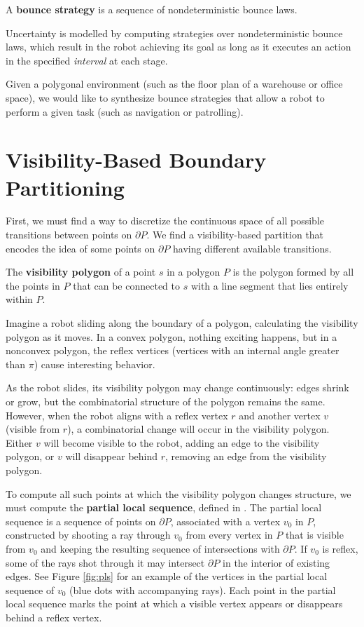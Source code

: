 \documentclass[]{styles/svproc}  %
\begin{document}
\begin{definition}
A \textbf{bounce strategy} is a sequence of nondeterministic bounce laws.
\end{definition}
Uncertainty is modelled by computing strategies over nondeterministic bounce
laws, which result in the robot achieving its goal as long as it executes an
action in the specified \emph{interval} at each stage.

Given a polygonal environment (such as the floor plan of a warehouse or office
space), we would like to synthesize bounce strategies that allow a robot to
perform a given task (such as navigation or patrolling).



\section{Visibility-Based Boundary Partitioning} \label{sec:partition}

First, we must find a way to discretize the continuous space of all possible
transitions between points on $\partial P$. We find a visibility-based partition
that encodes the idea of some points on $\partial P$ having different
available transitions.

\begin{definition}
The \textbf{visibility polygon} of a point $s$ in a polygon $P$ is the polygon
formed by all the points in $P$ that can be connected to $s$ with a line
segment that lies entirely within $P$.
\end{definition}
Imagine a robot sliding along the boundary of a polygon, calculating 
the visibility polygon as it moves. In a convex polygon, nothing exciting 
happens, but in a nonconvex polygon, the reflex vertices (vertices with an
internal angle greater than $\pi$) cause interesting
behavior.

As the robot slides, its visibility polygon may change continuously: edges
shrink or grow, but the combinatorial structure of the polygon remains the same.
However, when the robot aligns with a reflex vertex $r$ and another vertex $v$ (visible
from $r$), a combinatorial change will occur in the visibility polygon. Either 
$v$ will become visible to the robot, adding an edge to the visibility 
polygon, or $v$ will disappear behind $r$, removing an edge from the visibility polygon.

To compute all such points at which the visibility polygon changes structure, we
must compute the \textbf{partial local sequence}, defined in \cite{rourke_viz}.
The partial local sequence is a sequence of points on $\partial P$, associated with 
a vertex $v_0$ in $P$, constructed by shooting a ray through $v_0$ from every vertex in $P$
that is visible from $v_0$ and keeping the resulting sequence of intersections with
$\partial P$. If $v_0$ is reflex, some of the rays shot through it may intersect
$\partial P$ in the interior of existing edges. See Figure \ref{fig:pls} for an
example of the vertices in the partial local sequence of $v_0$ (blue dots with
accompanying rays). Each point in the partial local sequence marks the point
at which a visible vertex appears or disappears behind a reflex vertex.
\end{document}
